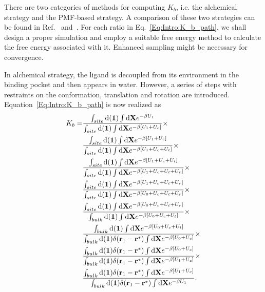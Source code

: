 There are two categories of methods for computing $K_b$, i.e. the alchemical strategy\cite{DengJCTC2006} and the PMF-based strategy\cite{WooPNAS2005}. A comparison of these two strategies can be found in Ref.~\cite{DengJPCB2009} and~\cite{GumbartJCTC2013}. For each ratio in Eq.~\ref{Eq:Intro:K_b_path}, we shall design a proper simulation and employ a suitable free energy method to calculate the free energy associated with it. Enhanced sampling might be necessary for convergence.

In alchemical strategy, the ligand is decoupled from its environment in the binding pocket and then appears in water. However, a series of steps with restraints on the conformation, translation and rotation are introduced. Equation~\ref{Eq:Intro:K_b_path} is now realized as
\begin{align}
  K_b=&\frac{\int_{site}\diff(\mathbf{1})\int \diff\mathbf{X}e^{-\beta U_1}}{\int_{site}\diff(\mathbf{1})\int \diff\mathbf{X}e^{-\beta [U_1+U_c]}}\times\notag\\
      &\frac{\int_{site}\diff(\mathbf{1})\int \diff\mathbf{X}e^{-\beta [U_1+U_c]}}{\int_{site}\diff(\mathbf{1})\int \diff\mathbf{X}e^{-\beta [U_1+U_c+U_t]}}\times\notag\\
      &\frac{\int_{site}\diff(\mathbf{1})\int \diff\mathbf{X}e^{-\beta [U_1+U_c+U_t]}}{\int_{site}\diff(\mathbf{1})\int \diff\mathbf{X}e^{-\beta [U_1+U_c+U_t+U_r]}}\times\notag\\
      &\frac{\int_{site}\diff(\mathbf{1})\int \diff\mathbf{X}e^{-\beta [U_1+U_c+U_t+U_r]}}{\int_{site}\diff(\mathbf{1})\int \diff\mathbf{X}e^{-\beta [U_0+U_c+U_t+U_r]}}\times\notag\\
      &\frac{\int_{site}\diff(\mathbf{1})\int \diff\mathbf{X}e^{-\beta [U_0+U_c+U_t+U_r]}}{\int_{bulk}\diff(\mathbf{1})\int \diff\mathbf{X}e^{-\beta [U_0+U_c+U_t]}}\times\notag\\
      &\frac{\int_{bulk}\diff(\mathbf{1})\int \diff\mathbf{X}e^{-\beta [U_0+U_c+U_t]}}{\int_{bulk}\diff(\mathbf{1})\delta(\mathbf{r}_1-\mathbf{r}^*)\int \diff\mathbf{X}e^{-\beta [U_0+U_c]}}\times\notag\\
      &\frac{\int_{bulk}\diff(\mathbf{1})\delta(\mathbf{r}_1-\mathbf{r}^*)\int \diff\mathbf{X}e^{-\beta [U_0+U_c]}}{\int_{bulk}\diff(\mathbf{1})\delta(\mathbf{r}_1-\mathbf{r}^*)\int \diff\mathbf{X}e^{-\beta [U_1+U_c]}}\times\notag\\
      &\frac{\int_{bulk}\diff(\mathbf{1})\delta(\mathbf{r}_1-\mathbf{r}^*)\int \diff\mathbf{X}e^{-\beta [U_1+U_c]}}{\int_{bulk}\diff(\mathbf{1})\delta(\mathbf{r}_1-\mathbf{r}^*)\int \diff\mathbf{X}e^{-\beta U_1}}.
\end{align}

